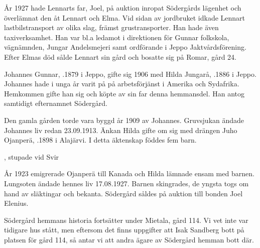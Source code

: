 År 1927 hade Lennarts far, Joel, på auktion inropat Södergårds lägenhet och överlämnat den åt Lennart och Elma. Vid sidan av jordbruket idkade Lennart lastbilstransport av olika slag, främst grustransporter. Han hade även taxiverksamhet. Han var bl.a ledamot i direktionen för Gunnar folkskola, vägnämnden, Jungar Andelsmejeri samt ordförande i Jeppo Jaktvårdsförening. Efter Elmas död sålde Lennart sin gård och bosatte sig på Romar, gård 24.


%
Johannes Gunnar, .1879 i Jeppo, gifte sig 1906 med Hilda Jungarå, .1886 i Jeppo. Johannes hade i unga år varit på på arbetsförjänst i Amerika och Sydafrika. Hemkommen gifte han sig och köpte av sin far denna hemmansdel. Han antog samtidigt efternamnet Södergård.
\begin{jhchildren}
  \item {}
  \item {}
  \item {}
  \item {}
\end{jhchildren}

Den gamla gården torde vara byggd år 1909 av Johannes. Gruvsjukan ändade Johannes liv redan 23.09.1913. Änkan Hilda gifte om sig med drängen Juho Ojanperä, .1898 i Alajärvi. I detta äktenskap föddes fem barn.
\begin{jhchildren}
  \item {}
  \item {}
  \item {}
  \item {}, stupade vid Svir
  \item {}
\end{jhchildren}

År 1923 emigrerade Ojanperä till Kanada och Hilda lämnade ensam med barnen. Lungsoten ändade hennes liv 17.08.1927. Barnen skingrades, de yngsta togs om hand av släktingar och bekanta. Södergård såldes på auktion till bonden Joel Elenius.

Södergård hemmans historia fortsätter under Mietala, gård 114. Vi vet inte var tidigare hus stått, men eftersom det finns uppgifter att Isak Sandberg bott på platsen för gård 114, så antar vi att andra ägare av Södergård hemman bott där.
